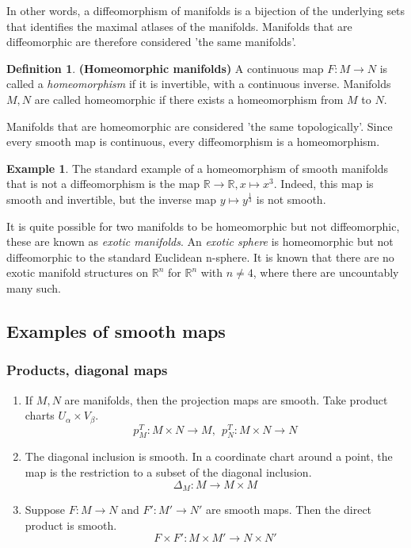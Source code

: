 \documentclass{article}
\theoremstyle{definition}
\newtheorem{defn}[theorem]{Definition}
\newtheorem{example}[theorem]{Example}
\newenvironment{definition}
  {\vspace{8pt}\begin{mdframed}[backgroundcolor=blueish,innertopmargin=4]\begin{defn}}
  {\end{defn}\end{mdframed}\vspace{4pt}}
\begin{document}
In other words, a diffeomorphism of manifolds is a bijection of the underlying sets that identifies the maximal atlases of the manifolds. Manifolds that are diffeomorphic are therefore considered 'the same manifolds'.

\begin{definition} \textbf{(Homeomorphic manifolds)}
A continuous map $F : M \rightarrow N$ is called a \textit{homeomorphism} if it is invertible, with a continuous inverse.  Manifolds $M,N$ are called homeomorphic if there exists a homeomorphism from $M$ to $N$.
\end{definition}

Manifolds that are homeomorphic are considered 'the same topologically'. Since every smooth map is continuous, every diffeomorphism is a homeomorphism.

\begin{example}
The standard example of a homeomorphism of smooth manifolds that is not a diffeomorphism is the map $\mathbb R \rightarrow \mathbb R, x \mapsto x^3$. Indeed, this map is smooth and invertible, but the inverse map $y \mapsto y ^{\frac{1}{3}}$ is not smooth.
\end{example}

It is quite possible for two manifolds to be homeomorphic but not diffeomorphic, these are known as \textit{exotic manifolds}. An \textit{exotic sphere} is homeomorphic but not diffeomorphic to the standard Euclidean n-sphere. It is known that there are no exotic manifold structures on $\mathbb R^n$ for $\mathbb R^n$ with $n \neq 4$, where there are uncountably many such.

\subsection{Examples of smooth maps}

\subsubsection{Products, diagonal maps}
\begin{enumerate}
    \item  If $M,N$ are manifolds, then the projection maps are smooth. Take product charts  $U_\alpha \times V_\beta$.
    \[
        p^{T}_M : M \times N  \rightarrow M, \ \
        p^{T}_N :  M \times N \rightarrow N
    \]
    
    \item The diagonal inclusion is smooth. In a coordinate chart around a point, the map is the restriction to a subset of the diagonal inclusion.
    \[
        \Delta_M : M \rightarrow  M \times M
    \]
    
    \item  Suppose $F : M \rightarrow N$ and $F' : M' \rightarrow N'$ are smooth maps. Then the direct product is smooth.
    \[
        F \times F' : M \times M' \rightarrow N \times N'
    \]
    
\end{enumerate}
\end{document}
